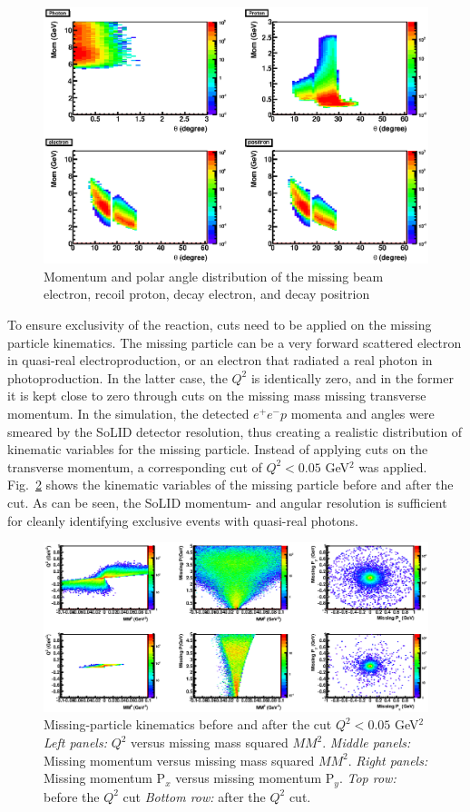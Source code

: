 \begin{figure}[t]
\includegraphics[width=125mm]{theta_mom_final.eps}
\caption{\small{Momentum and polar angle distribution of the missing
beam electron, recoil proton, decay electron, and decay positrion}}
\label{fig:theta_mom}
\end{figure}

To ensure exclusivity of the reaction, cuts need to be applied on the missing
particle kinematics. The missing particle can be a very forward scattered
electron in quasi-real electroproduction, or an electron that radiated a real
photon in photoproduction. In the latter case, the $Q^2$ is identically zero,
and in the former it is kept close to zero through cuts on the missing mass
missing transverse momentum.
In the simulation, the detected $e^+e^-p$ momenta and angles were smeared by
the SoLID detector resolution, thus creating a realistic distribution of
kinematic variables for the missing particle. Instead of applying cuts on the
transverse momentum, a corresponding cut of $Q^2 < 0.05$ GeV$^2$ was applied.
Fig.~\ref{fig:Miss_2D} shows the kinematic variables of the missing particle
before and after the cut. As can be seen, the SoLID momentum- and angular
resolution is sufficient for cleanly identifying exclusive events with
quasi-real photons.

\begin{figure}[t]
\includegraphics[width=125mm]{Miss_2D.eps}
\caption{\small{Missing-particle kinematics before and after the cut
$Q^2 < 0.05$ GeV$^2$
{\it Left panels:} $Q^2$ versus missing mass squared $MM^2$.
{\it Middle panels:} Missing momentum versus missing mass squared $MM^2$.
{\it Right panels:} Missing momentum P$_x$ versus missing momentum P$_y$.
{\it Top row:} before the $Q^2$ cut
{\it Bottom row:} after the $Q^2$ cut.}}
\label{fig:Miss_2D}
\end{figure}
